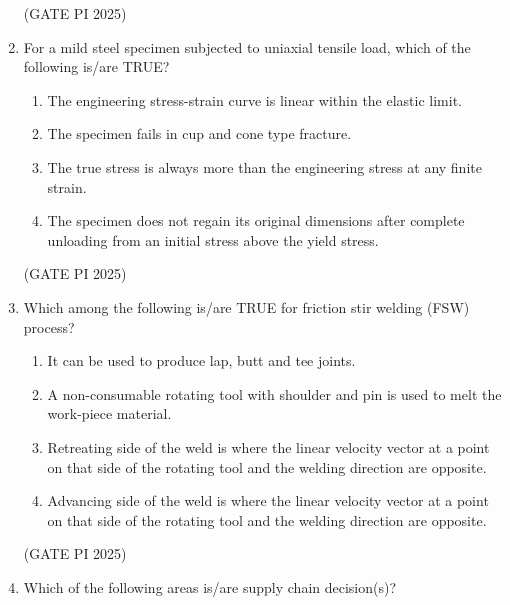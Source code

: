 \documentclass[journal,12pt,onecolumn]{IEEEtran}
\theoremstyle{remark}
\begin{document}
\begin{enumerate}
\hfill (GATE PI 2025)

\item For a mild steel specimen subjected to uniaxial tensile load, which of the following is/are TRUE?
\begin{enumerate}
    \item The engineering stress-strain curve is linear within the elastic limit.
    \item The specimen fails in cup and cone type fracture.
    \item The true stress is always more than the engineering stress at any finite strain.
    \item The specimen does not regain its original dimensions after complete unloading from an initial stress above the yield stress.
\end{enumerate}

\hfill (GATE PI 2025)

\item Which among the following is/are TRUE for friction stir welding (FSW) process?


\begin{enumerate}
    \item It can be used to produce lap, butt and tee joints.
    \item A non-consumable rotating tool with shoulder and pin is used to melt the work-piece material.
    \item Retreating side of the weld is where the linear velocity vector at a point on that side of the rotating tool and the welding direction are opposite.
    \item Advancing side of the weld is where the linear velocity vector at a point on that side of the rotating tool and the welding direction are opposite.
\end{enumerate}

\hfill (GATE PI 2025)

\item Which of the following areas is/are supply chain decision(s)?

\begin{enumerate}
\end{enumerate}


\end{enumerate}
\end{document}
